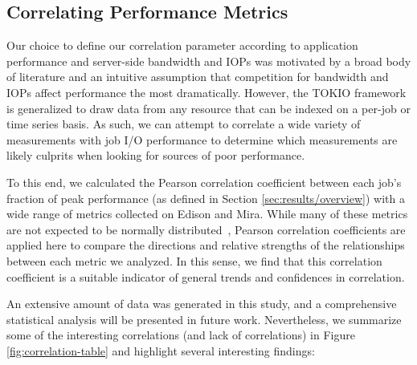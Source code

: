 \subsection{Correlating Performance Metrics} \label{sec:results/correlating}

Our choice to define our correlation parameter according to application performance and server-side bandwidth and IOPs was motivated by a broad body of literature and an intuitive assumption that competition for bandwidth and IOPs affect performance the most dramatically.
However, the TOKIO framework is generalized to draw data from any resource that can be indexed on a per-job or time series basis.
As such, we can attempt to correlate a wide variety of measurements with job I/O performance to determine which measurements are likely culprits when looking for sources of poor performance.

To this end, we calculated the Pearson correlation coefficient between each job's fraction of peak performance (as defined in Section \ref{sec:results/overview}) with a wide range of metrics collected on Edison and Mira.
While many of these metrics are not expected to be normally distributed~\cite{Kim2010}, Pearson correlation coefficients are applied here to compare the directions and relative strengths of the relationships between each metric we analyzed.
In this sense, we find that this correlation coefficient is a suitable indicator of general trends and confidences in correlation.

An extensive amount of data was generated in this study, and a comprehensive statistical analysis will be presented in future work.
Nevertheless, we summarize some of the interesting correlations (and lack of correlations) in Figure \ref{fig:correlation-table} and highlight several interesting findings:

